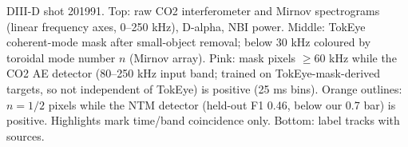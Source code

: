 \caption{DIII-D shot 201991. Top: raw CO2 interferometer and Mirnov spectrograms (linear frequency axes, 0--250 kHz), D-alpha, NBI power. Middle: TokEye coherent-mode mask after small-object removal; below 30 kHz coloured by toroidal mode number $n$ (Mirnov array). Pink: mask pixels $\geq$60 kHz while the CO2 AE detector (80--250 kHz input band; trained on TokEye-mask-derived targets, so not independent of TokEye) is positive (25 ms bins). Orange outlines: $n=1/2$ pixels while the NTM detector (held-out F1 0.46, below our 0.7 bar) is positive. Highlights mark time/band coincidence only. Bottom: label tracks with sources.}
\label{fig:interpreter-201991}
